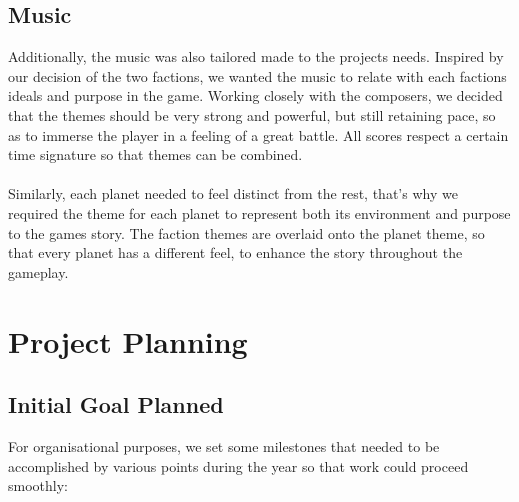 \documentclass[11pt,a4paper]{article}
\begin{document}
        \subsection{Music}
    Additionally, the music was also tailored made to the projects needs. Inspired by our decision of the two factions, we wanted the music to relate with each factions ideals and purpose in the game. Working closely with the composers, we decided that the themes should be very strong and powerful, but still retaining pace, so as to immerse the player in a feeling of a great battle. All scores respect a certain time signature so that themes can be combined.\\ \\

\noindent
    Similarly, each planet needed to feel distinct from the rest, that's why we required the theme for each planet to represent both its environment and purpose to the games story. The faction themes are overlaid onto the planet theme, so that every planet has a different feel, to enhance the story throughout the gameplay.

\pagebreak

        \section{Project Planning}

        \subsection{Initial Goal Planned}

        \noindent
        For organisational purposes, we set some milestones that needed to be accomplished by various points during the year so that work could proceed smoothly: \\ \\
\end{document}
